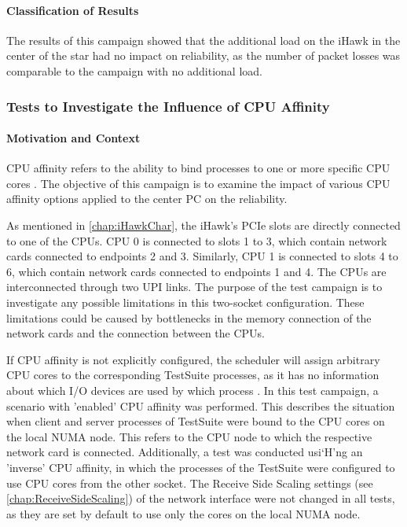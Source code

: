 \paragraph{Classification of Results}
The results of this campaign showed that the additional load on the iHawk in the center of the star had no impact on reliability, as the number of packet losses was comparable to the campaign with no additional load.


\subsubsection{Tests to Investigate the Influence of CPU Affinity} \label{chap:AffinityAnalysis}
\paragraph{Motivation and Context}

CPU affinity refers to the ability to bind processes to one or more specific CPU cores \cite{reli06}. The objective of this campaign is to examine the impact of various CPU affinity options applied to the center PC on the reliability.

As mentioned in \ref{chap:iHawkChar}, the iHawk's PCIe slots are directly connected to one of the CPUs. CPU 0 is connected to slots 1 to 3, which contain network cards connected to endpoints 2 and 3. Similarly, CPU 1 is connected to slots 4 to 6, which contain network cards connected to endpoints 1 and 4. The CPUs are interconnected through two UPI links. The purpose of the test campaign is to investigate any possible limitations in this two-socket configuration. These limitations could be caused by bottlenecks in the memory connection of the network cards and the connection between the CPUs.

If CPU affinity is not explicitly configured, the scheduler will assign arbitrary CPU cores to the corresponding TestSuite processes, as it has no information about which I/O devices are used by which process \cite{reli07}. In this test campaign, a scenario with 'enabled' CPU affinity was performed. This describes the situation when client and server processes of TestSuite were bound to the CPU cores on the local NUMA node. This refers to the CPU node to which the respective network card is connected. Additionally, a test was conducted usi`H'ng an 'inverse' CPU affinity, in which the processes of the TestSuite were configured to use CPU cores from the other socket. The Receive Side Scaling settings (see \ref{chap:ReceiveSideScaling}) of the network interface were not changed in all tests, as they are set by default to use only the cores on the local NUMA node.


